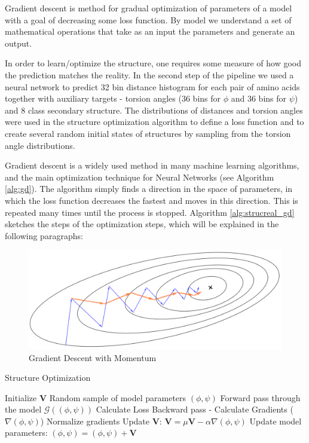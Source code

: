 Gradient descent is method for gradual optimization of parameters of a model with a goal of decreasing some loss function. By model we understand a set of mathematical operations that take as an input the parameters and generate an output. 

In order to learn/optimize the structure, one requires some measure of how good the prediction matches the reality. In the second step of the pipeline we used a neural network to predict 32 bin distance histogram for each pair of amino acids together with auxiliary targets - torsion angles (36 bins for $\phi$ and 36 bins for $\psi$) and 8 class secondary structure. The distributions of distances and torsion angles were used in the structure optimization algorithm to define a loss function and to create several random initial states of structures by sampling from the torsion angle distributions.

Gradient descent is a widely used method in many machine learning algorithms, and the main optimization technique for Neural Networks (see Algorithm \ref{alg:gd}). The algorithm simply finds a direction in the space of parameters, in which the loss function decreases the fastest and moves in this direction. This is repeated many times until the process is stopped. Algorithm \ref{alg:strucreal_gd} sketches the steps of the optimization steps, which will be explained in the following paragraphs:

\begin{figure}
    \centering
    \includegraphics[width=\linewidth]{imgs_tomas/momentum.png}
    \caption{Gradient Descent with Momentum}
    \label{fig:momentum}
\end{figure}

\begin{algorithm}[ht]
\caption{Structure Optimization}
\label{alg:strucreal_gd}
\begin{algorithmic}[1]
\State Initialize $\bm{V}$
\State Random sample of model parameters $(\phi, \psi)$
    \Repeat
        \State Forward pass through the model $\mathcal{G}((\phi, \psi))$
        \State Calculate Loss
        \State Backward pass - Calculate Gradients ($\nabla (\phi, \psi)$)
        \State Normalize gradients
        \State Update $\bm{V}$: $\bm{V} = \mu \bm{V} - \alpha \nabla (\phi, \psi)$
        \State Update model parameters: $(\phi, \psi) = (\phi, \psi) + \bm{V}$
\end{algorithmic}
\end{algorithm}

